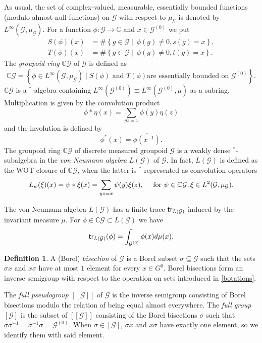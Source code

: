 \documentclass[a4paper,11pt]{article}
\numberwithin{equation}{section}
\theoremstyle{definition}
\newtheorem{defn}[thm]{Definition}
\theoremstyle{remark}
\numberwithin{equation}{section}
\newcommand{\rG}{\mathcal{G}}
\def\sub{\subseteq}
\def\trace{{\sf tr}}
\def\CC{\mathbb C}
\numberwithin{equation}{section}
\begin{document}
As usual, the set of complex-valued, measurable, essentially bounded 
functions (modulo almost null functions) 
on $\rG$ with respect to $\mu_\rG$ is denoted by 
$L^\infty (\rG,\mu_\rG)$. For a function $\phi:\rG\rightarrow\CC$ and 
$x\in\rG^{(0)}$ we put 
\begin{equation*}\begin{aligned}
S(\phi)(x)&=\#\left\{g\in\rG\mid ~\phi(g)\ne
  0,s(g)=x\right\},\\ 
T(\phi)(x)&=\#\left\{g\in\rG\mid~\phi(g)\ne
  0,t(g)=x\right\}.
\end{aligned}
\end{equation*}
The {\it groupoid ring} $\CC\rG$ of $\rG$ is defined as 
$$
\CC\rG=\left\{\phi\in L^\infty(\rG,\mu_\rG)\mid \text{$S(\phi)$ and $T(\phi)$
    are essentially bounded on $\rG^{(0)}$}\right\}.
$$
$\CC\rG$ is a $^*$-algebra containing 
$L^\infty(\rG^{(0)})\equiv L^\infty(\rG^{(0)},\mu)$ 
as a subring. Multiplication 
is given by the convolution product 
\begin{equation}
\phi*\eta(x)=\sum_{yz=x}\phi(y)\eta(z)
\end{equation}
and the involution is defined by 
\begin{equation}
\phi^*(x)=\overline{\phi(x^{-1})}.
\end{equation}
The groupoid ring $\CC\rG$ of discrete measured groupoid $\rG$ 
is a weakly dense $^*$-subalgebra in the {\it von Neumann algebra} $L(\rG)$ of $\rG$. In fact, $L(\rG)$ is defined as the WOT-closure of $\CC\rG$, when the latter is $^*$-represented as convolution operators $$L_\psi(\xi)(x)=\psi*\xi(x)= \sum_{yz=x}\psi(y)\xi(z),\quad\textup{   for }\psi\in \CC\rG, \xi\in L^2(\rG,\mu_{\rG}).$$

The von Neumann algebra $L(\rG)$ has a finite trace
$\trace_{L(\rG)}$ induced by the invariant measure $\mu$. 
For $\phi\in\CC\rG\subset L(\rG)$ we have 
\begin{equation}
\trace_{L(\rG)}(\phi)=\int_{\rG^{(0)}}\phi(x)d\mu(x).
\end{equation}


\begin{defn}
  A (Borel) \textit{bisection} of $ \rG $ is a Borel subset $ \sigma\sub \rG $ such that the sets $ \sigma x $ and $ x\sigma $ have at most $ 1 $ element for every $ x\in G^{0} $. Borel bisections form an inverse semigroup with respect to the operation on sets introduced in \ref{botations}.
  
  
  The \textit{full pseudogroup} $ [[\rG]] $ of $ \rG $ is the inverse semigroup consisting of Borel bisections modulo the relation of being equal almost everywhere. The \textit{full group} $ [\rG] $ is the subset of $ [[\rG]] $ consisting of the Borel bisections $ \sigma $ such that $ \sigma\sigma^{-1} = \sigma^{-1}\sigma = \rG^{(0)} $. When $\sigma\in [\rG]$, $ \sigma x $ and $ x\sigma $ have exactly one element, so we identify them with said element.
\end{defn}
\end{document}
